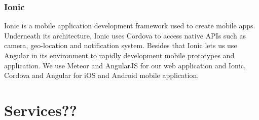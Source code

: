 \subsubsection{Ionic}
Ionic is a mobile application development framework used to create mobile apps. Underneath its architecture, Ionic uses Cordova to access native APIs such as camera, geo-location and notification system. Besides that Ionic lets us use Angular in its environment to rapidly development mobile prototypes and application. We use Meteor and AngularJS for our web application and Ionic, Cordova and Angular for iOS and Android mobile application.
\section{Services??}